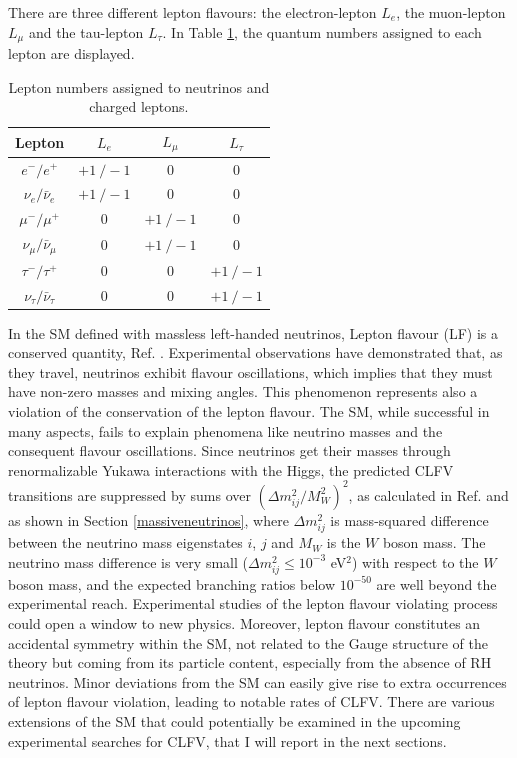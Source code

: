 There are three different lepton flavours: the electron-lepton $L_e$, 
the muon-lepton $L_{\mu}$ and the tau-lepton $L_{\tau}$. In Table 
\ref{tab:leptons}, the quantum numbers assigned to each lepton are displayed.
 \begin{center}  
\begin{table}[!h]
\centering
\renewcommand{\arraystretch}{1.5}
\begin{tabular}{c c c c}
\hline
Lepton & $L_e$ & $L_{\mu}$ & $L_{\tau}$\\
\hline
$e^-/e^+$ & $+1 \ /-1$ & 0 & 0 \\
$\nu_{e}/\bar{\nu}_{e}$ & $+1 \ /-1$ & 0 & 0 \\
$\mu^-/\mu^+$ & 0 & $+1 \ /-1$ & 0 \\
$\nu_{\mu}/\bar{\nu}_{\mu}$ & 0 & $+1 \ /-1$ & 0 \\
$\tau^-/\tau^+$ & 0 & 0 & $+1 \ /-1$\\
$\nu_{\tau}/\bar{\nu}_{\tau}$ & 0 & 0 & $+1 \ /-1$ \\
\hline
\end{tabular}
\caption{Lepton numbers assigned to neutrinos and charged leptons.}
\label{tab:leptons}
\end{table}
\end{center}
In the SM defined with massless 
left-handed neutrinos, Lepton flavour (LF) is a conserved quantity, 
Ref. \cite{universe8060299}. Experimental observations have 
demonstrated that, as they travel, neutrinos exhibit flavour 
oscillations, which implies that they must have non-zero masses 
and mixing angles. This phenomenon represents also a violation 
of the conservation of the lepton flavour. The SM, 
while successful in many aspects, fails to explain phenomena 
like neutrino masses and the consequent flavour oscillations. 
Since neutrinos get their masses through renormalizable Yukawa interactions
with the Higgs, the predicted CLFV transitions are suppressed 
by sums over $(\Delta m^2_{i j}/M^2 _W)^2$, as calculated in 
Ref. \cite{MARCIANO1977303} and as shown in Section 
\ref{massiveneutrinos}, where $\Delta m^2_{ij}$ is mass-squared 
difference between the neutrino mass eigenstates $i$, $j$ and 
$M_W$ is the $W$ boson mass. The neutrino mass difference is 
very small ($\Delta m^2 _{i j} \leq 10^{-3}$ eV$^2$) with respect to the $W$ boson mass,
and the expected branching ratios  
below $10^{-50}$ are well beyond the experimental reach. Experimental studies 
of the lepton flavour violating process could open a window to new physics. 
Moreover, lepton flavour constitutes an accidental symmetry within the SM, 
not related to the Gauge structure of the theory but coming
from its particle content, especially from the absence of RH neutrinos. 
Minor deviations from the SM can easily give rise to extra 
occurrences of lepton flavour violation, leading to notable rates of CLFV.
There are various extensions of the SM that could potentially 
be examined in the upcoming experimental searches for CLFV, that 
I will report in the next sections.



